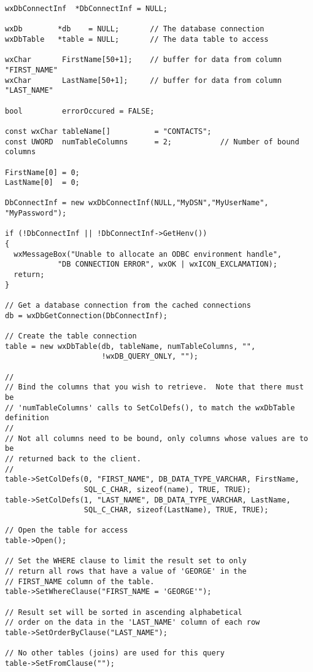 \begin{verbatim}
wxDbConnectInf  *DbConnectInf = NULL;

wxDb        *db    = NULL;       // The database connection
wxDbTable   *table = NULL;       // The data table to access

wxChar       FirstName[50+1];    // buffer for data from column "FIRST_NAME"
wxChar       LastName[50+1];     // buffer for data from column "LAST_NAME"

bool         errorOccured = FALSE;

const wxChar tableName[]          = "CONTACTS";
const UWORD  numTableColumns      = 2;           // Number of bound columns

FirstName[0] = 0;
LastName[0]  = 0;

DbConnectInf = new wxDbConnectInf(NULL,"MyDSN","MyUserName", "MyPassword");

if (!DbConnectInf || !DbConnectInf->GetHenv())
{
  wxMessageBox("Unable to allocate an ODBC environment handle",
            "DB CONNECTION ERROR", wxOK | wxICON_EXCLAMATION);
  return;
} 

// Get a database connection from the cached connections
db = wxDbGetConnection(DbConnectInf);

// Create the table connection
table = new wxDbTable(db, tableName, numTableColumns, "", 
                      !wxDB_QUERY_ONLY, "");

//
// Bind the columns that you wish to retrieve.  Note that there must be
// 'numTableColumns' calls to SetColDefs(), to match the wxDbTable definition
//
// Not all columns need to be bound, only columns whose values are to be 
// returned back to the client.
//
table->SetColDefs(0, "FIRST_NAME", DB_DATA_TYPE_VARCHAR, FirstName,
                  SQL_C_CHAR, sizeof(name), TRUE, TRUE);
table->SetColDefs(1, "LAST_NAME", DB_DATA_TYPE_VARCHAR, LastName,
                  SQL_C_CHAR, sizeof(LastName), TRUE, TRUE);

// Open the table for access
table->Open();

// Set the WHERE clause to limit the result set to only
// return all rows that have a value of 'GEORGE' in the
// FIRST_NAME column of the table.
table->SetWhereClause("FIRST_NAME = 'GEORGE'");

// Result set will be sorted in ascending alphabetical 
// order on the data in the 'LAST_NAME' column of each row
table->SetOrderByClause("LAST_NAME");

// No other tables (joins) are used for this query
table->SetFromClause("");


\end{verbatim}
